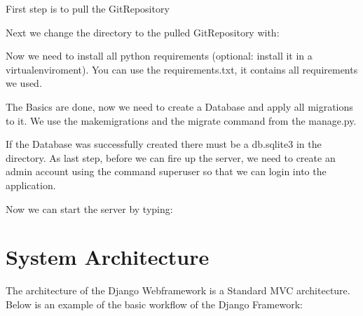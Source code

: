 \documentclass[letterpaper,10pt,english]{sphinxmanual}
\begin{document}
First step is to pull the Git\sphinxhyphen{}Repository
\begin{quote}

\end{quote}

Next we change the directory to the pulled Git\sphinxhyphen{}Repository with:
\begin{quote}

\end{quote}

Now we need to install all python requirements (optional: install it in a virtualenviroment).
You can use the requirements.txt, it contains all requirements we used.
\begin{quote}

\end{quote}

The Basics are done, now we need to create a Database and apply all migrations to it. We use the
makemigrations and the migrate command from the manage.py.
\begin{quote}

\begin{DUlineblock}{0em}
\item[] 
\item[] 
\end{DUlineblock}
\end{quote}

If the Database was successfully created there must be a db.sqlite3 in the directory.
As last step, before we can fire up the server, we need to create an admin account
using the command superuser so that we can login into the application.
\begin{quote}

\end{quote}

Now we can start the server by typing:
\begin{quote}

\end{quote}


\section{System Architecture}
\label{\detokenize{masterDeveloperDoc:system-architecture}}
The architecture of the Django Webframework is a Standard MVC architecture.
Below is an example of the basic workflow of the Django Framework:
\end{document}
